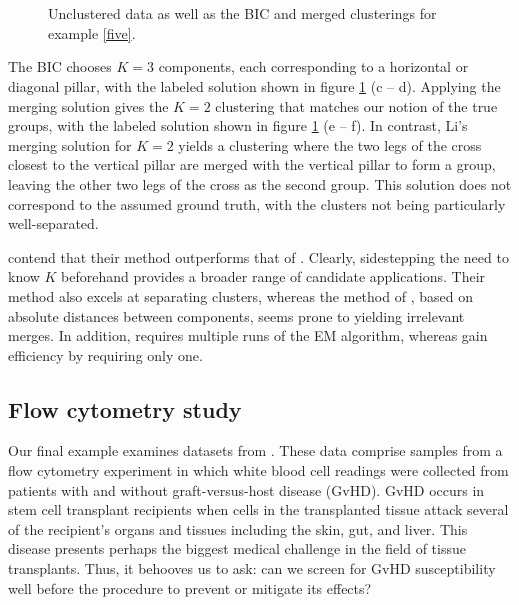 \documentclass{uwstat572}
\renewcommand\;{\,}
\begin{document}
 \begin{figure}
\begin{center}
\\
\\
\end{center}
\caption{Unclustered data as well as the BIC and merged clusterings for example \ref{five}.}
\label{Example4_2}
\end{figure}

The BIC chooses $K = 3$ components, each corresponding to a horizontal or diagonal pillar, with the labeled solution shown in figure \ref{Example4_2} (c -- d).
Applying the merging solution gives the $K = 2$ clustering that matches our notion of the true groups, with the labeled solution shown in figure \ref{Example4_2} (e -- f).
In contrast, Li's merging solution for $K = 2$ yields a clustering where the two legs of the cross closest to the vertical pillar are merged with the vertical pillar to form a group, leaving the other two legs of the cross as the second group.
This solution does not correspond to the assumed ground truth, with the clusters not being particularly well-separated.

\cite{Baudry10} contend that their method outperforms that of \cite{Li05}.
Clearly, sidestepping the need to know $K$ beforehand provides a broader range of candidate applications.
Their method also excels at separating clusters, whereas the method of \cite{Li05}, based on absolute distances between components, seems prone to yielding irrelevant merges. 
In addition, \cite{Li05} requires multiple runs of the EM algorithm, whereas \cite{Baudry10} gain efficiency by requiring only one.

\subsection{Flow cytometry study}\label{GvHD}
Our final example examines datasets from \cite{Brinkman07}.
These data comprise samples from a flow cytometry experiment in which white blood cell readings were collected from patients with and without graft-versus-host disease (GvHD).
GvHD occurs in stem cell transplant recipients when cells in the transplanted tissue attack several of the recipient's organs and tissues including the skin, gut, and liver.
This disease presents perhaps the biggest medical challenge in the field of tissue transplants.
Thus, it behooves us to ask: can we screen for GvHD susceptibility well before the procedure to prevent or mitigate its effects?
\end{document}
